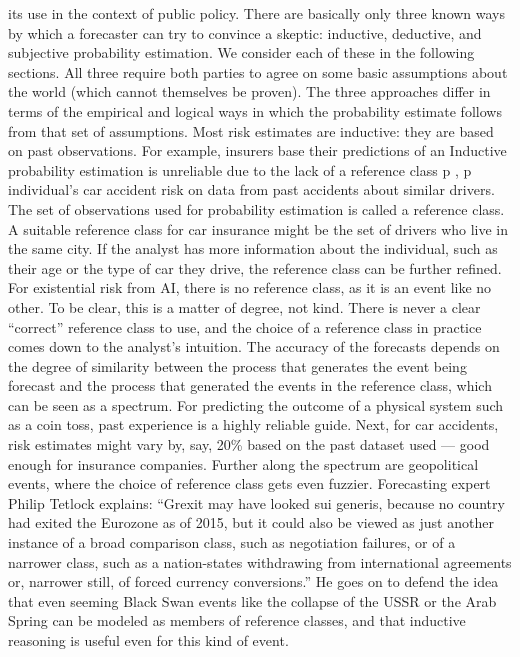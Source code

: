 its use in the context of public policy.
There are basically only three known ways by which a forecaster can
try to convince a skeptic: inductive, deductive, and subjective
probability estimation. We consider each of these in the following
sections. All three require both parties to agree on some basic
assumptions about the world (which cannot themselves be proven).
The three approaches differ in terms of the empirical and logical
ways in which the probability estimate follows from that set of
assumptions.
Most risk estimates are inductive: they are based on past
observations. For example, insurers base their predictions of an
Inductive probability estimation is unreliable
due to the lack of a reference class
p ,
p
individual’s car accident risk on data from past accidents about
similar drivers. The set of observations used for probability
estimation is called a reference class. A suitable reference class for
car insurance might be the set of drivers who live in the same city. If
the analyst has more information about the individual, such as their
age or the type of car they drive, the reference class can be further
reﬁned.
For existential risk from AI, there is no reference class, as it is an
event like no other. To be clear, this is a matter of degree, not kind.
There is never a clear “correct” reference class to use, and the
choice of a reference class in practice comes down to the analyst’s
intuition.
The accuracy of the forecasts depends on the degree of similarity
between the process that generates the event being forecast and the
process that generated the events in the reference class, which can
be seen as a spectrum. For predicting the outcome of a physical
system such as a coin toss, past experience is a highly reliable guide.
Next, for car accidents, risk estimates might vary by, say, 20\% based
on the past dataset used — good enough for insurance companies.
Further along the spectrum are geopolitical events, where the choice
of reference class gets even fuzzier. Forecasting expert Philip Tetlock
explains: “Grexit may have looked sui generis, because no country
had exited the Eurozone as of 2015, but it could also be viewed as
just another instance of a broad comparison class, such as
negotiation failures, or of a narrower class, such as a nation-states
withdrawing from international agreements or, narrower still, of forced
currency conversions.” He goes on to defend the idea that even
seeming Black Swan events like the collapse of the USSR or the
Arab Spring can be modeled as members of reference classes, and
that inductive reasoning is useful even for this kind of event.

